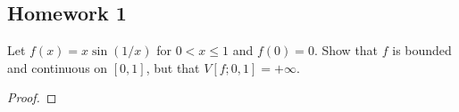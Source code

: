 \subsection{Homework 1}
\begin{problem}
Let $f(x)=x\sin(1/x)$ for $0<x\leq 1$ and $f(0)=0$. Show that $f$ is
bounded and continuous on $[0,1]$, but that $V[f;0,1]=+\infty$.
\end{problem}
\begin{proof}




\end{proof}
